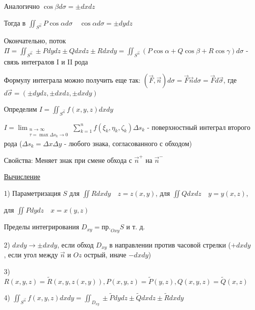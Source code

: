 \documentclass[12pt]{article}
\begin{document}
    Аналогично $\cos\beta d\sigma = \pm dxdz$

    Тогда в $\iint_{S^{\overrightarrow{n}}} P\cos\alpha d\sigma \quad \cos\alpha d\sigma = \pm dydz$

    \hypertarget{connectionbetweensurfaceintegral}{}

    Окончательно, поток $\Pi = \iint_{S^{\overrightarrow{n}}} \pm Pdydz \pm Qdxdz \pm Rdxdy = \iint_{S^{\overrightarrow{n}}} (P\cos\alpha + Q\cos\beta + R\cos\gamma) d\sigma$ - связь интегралов I и II рода

    \Nota Формулу интеграла можно получить еще так: $(\overrightarrow{F}, \overrightarrow{n})d\sigma = \overrightarrow{F}\overrightarrow{n}d\sigma = \overrightarrow{F}d\overrightarrow{\sigma}$, где $d\overrightarrow{\sigma} = (\pm dydz, \pm dxdz, \pm dxdy)$

    \hypertarget{surfaceintegralofsecondkindmath}{}


    Определим $I = \iint_{S^{\overrightarrow{n}}} f(x, y, z) dxdy$

    $I = \lim_{\substack{n \to \infty \\ \tau = \max \Delta s_k \to 0}} \sum_{k=1}^n f(\xi_k, \eta_k, \zeta_k) \Delta s_k$ - поверхностный интеграл второго рода
    ($\Delta s_k = \Delta x\Delta y$ - любого знака, согласованного с обходом)

    \hypertarget{surfaceintegralofsecondkindproperties}{}

    Свойства: Меняет знак при смене обхода с $\overrightarrow{n}^+$ на $\overrightarrow{n}^-$

    \hypertarget{surfaceintegralofsecondkindcalculation}{}

    \underline{Вычисление}

    1) Параметризация $S$ \quad для $\iint Rdxdy \quad z = z(x, y)$, для $\iint Qdxdz \quad y = y(x, z)$,

    для $\iint Pdydz \quad x = x(y, z)$

    Пределы интегрирования $D_{xy} = \text{пр.}_{Oxy} S$ и т. д.

    2) $dxdy \to \pm dxdy$, если обход $D_{xy}$ в направлении против часовой стрелки ($+dxdy$, если угол между $\overrightarrow{n}$ и $Oz$ острый, иначе $-dxdy$)

    3) $R(x, y, z) = \tilde{R}(x, y, z(x, y)), P(x, y, z) = \tilde{P}(y, z), Q(x, y, z) = \tilde{Q}(x, z)$

    4) $\iint_{S^{\overrightarrow{n}}} f(x, y, z) dxdy = \iint_{D_{xy}} \pm \tilde{P}dydz \pm \tilde{Q}dxdz \pm \tilde{R}dxdy$
\end{document}
